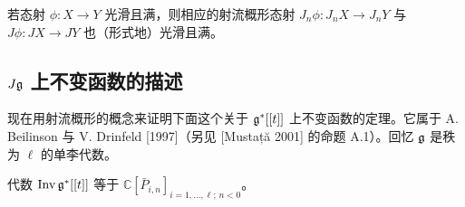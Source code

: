 \begin{lemma}
    若态射 $\phi:X\to Y$ 光滑且满，则相应的射流概形态射 $J_n\phi:J_nX\to J_nY$ 与 $J\phi:JX\to JY$ 也（形式地）光滑且满。
\end{lemma}

\subsection{$J\mathfrak{g}$ 上不变函数的描述}

现在用射流概形的概念来证明下面这个关于 $\mathfrak{g}^*[[t]]$ 上不变函数的定理。它属于 A. Beilinson 与 V. Drinfeld [1997]（另见 [Mustață 2001] 的命题 A.1）。回忆 $\mathfrak{g}$ 是秩为 $\ell$ 的单李代数。

\begin{theorem}
    代数 $\operatorname{Inv}\mathfrak{g}^*[[t]]$ 等于 $\mathbb{C}[\bar P_{i,n}]_{i=1,\dots,\ell;\,n<0}$。
\end{theorem}

